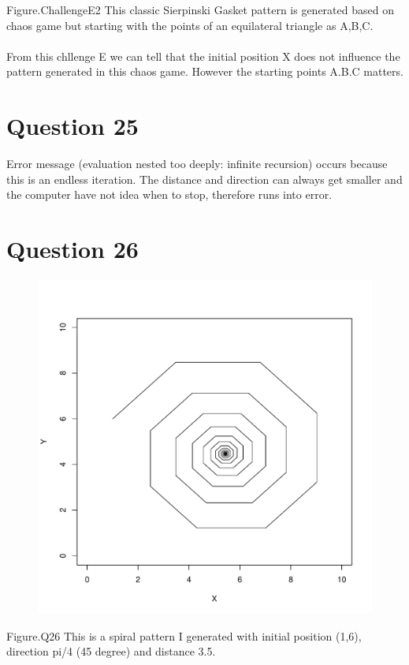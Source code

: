 \documentclass[12pt,a4paper]{article}
\begin{document}
Figure.ChallengeE2 This classic Sierpinski Gasket pattern is generated based on chaos game but starting with the points
of an equilateral triangle as A,B,C.
\\
\\
From this chllenge E we can tell that the initial position X does not influence the pattern generated in this chaos game.
However the starting points A.B.C matters.


\section{Question 25}
Error message (evaluation nested too deeply: infinite recursion) occurs because this is an endless iteration.
The distance and direction can always get smaller and the computer have not idea when to stop, therefore runs into error.

\newpage
\section{Question 26}
\begin{figure}[h]
\centering
\includegraphics[width=\textwidth]{Q26Plot.pdf}
\end{figure}
Figure.Q26 This is a spiral pattern I generated with initial position (1,6), direction pi/4 (45 degree) and distance 3.5.
\end{document}

